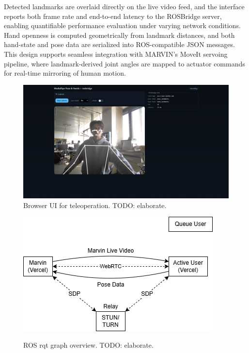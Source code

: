 \documentclass[sigconf]{acmart}
\begin{document}
Detected landmarks are overlaid directly on the live video feed, and the interface reports both frame rate and end-to-end latency to the ROSBridge server, enabling quantifiable performance evaluation under varying network conditions. Hand openness is computed geometrically from landmark distances, and both hand-state and pose data are serialized into ROS-compatible JSON messages. This design supports seamless integration with MARVIN’s MoveIt servoing pipeline, where landmark-derived joint angles are mapped to actuator commands for real-time mirroring of human motion.

\begin{figure}[htbp]
  \centering
  \includegraphics[width=\linewidth]{assets/web-ui}
  \caption{Browser UI for teleoperation. TODO: elaborate.} %
  \label{fig:ui}
\end{figure}

\begin{figure}[htbp]
  \centering
  \includegraphics[width=\linewidth]{assets/system-diagram}
  \caption{ROS rqt graph overview. TODO: elaborate.} %
  \label{fig:system}
\end{figure}
\end{document}
